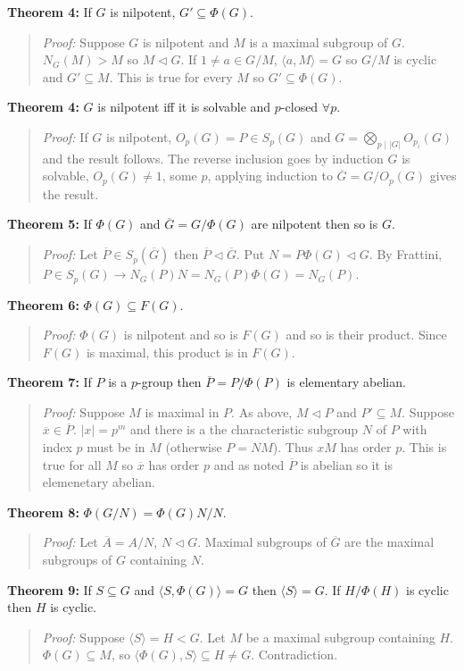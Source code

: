 {\bf Theorem 4:} If $G$ is nilpotent, $G' \subseteq \Phi(G)$.
\begin{quote}
\emph{Proof:}  Suppose $G$ is nilpotent and $M$ is a maximal subgroup of $G$.
$N_G(M)>M$ so $M \lhd G$.  If $1 \ne a \in G/M$, $ \langle a, M \rangle = G$ so $G/M$ is cyclic and
$G' \subseteq M$.  This is true for every $M$ so $G' \subseteq \Phi(G)$.
\end{quote}
{\bf Theorem 4:} $G$ is nilpotent iff it is solvable and $p$-closed $\forall p$.
\begin{quote}
\emph{Proof:} If $G$ is nilpotent, $O_p(G) = P \in S_p(G)$ and $G= \bigotimes_{p \mid |G|} O_{p_i}(G)$ and the result follows.
The reverse inclusion goes by induction $G$ is solvable, $O_p(G) \neq 1$, some $p$, applying induction to ${\overline G}=
G/O_p(G)$ gives the result.
\end{quote}
{\bf Theorem 5:} If $\Phi(G)$ and ${\overline G}= G/\Phi(G)$ are nilpotent then so is $G$.
\begin{quote}
\emph{Proof:} Let ${\overline P} \in S_p({\overline G})$ then ${\overline P} \lhd {\overline G}$.
Put $N= P \Phi(G) \lhd G$.  
By Frattini, $P \in S_p(G) \rightarrow N_G(P)N= N_G(P) \Phi(G)= N_G(P)$.
\end{quote}
{\bf Theorem 6:} $\Phi(G) \subseteq F(G)$.
\begin{quote}
\emph{Proof:} $\Phi(G)$ is nilpotent and so is $F(G)$ and so is their product.  Since
$F(G)$ is maximal, this product is in $F(G)$.
\end{quote}
{\bf Theorem 7:} If $P$ is a $p$-group then ${\overline P}= P/\Phi(P)$ is elementary abelian.
\begin{quote}
\emph{Proof:}  Suppose $M$ is maximal in $P$.  As above, $M \lhd P$ and $P' \subseteq M$.
Suppose ${\overline x} \in {\overline P}$.  $|x|= p^m$ and there is a the characteristic
subgroup $N$ of $P$ with index $p$ must be in $M$ (otherwise $P=NM$).  
Thus $xM$ has order $p$.  This is
true for all $M$ so ${\overline x}$ has order $p$ and as noted ${\overline P}$ is abelian so
it is elemenetary abelian.
\end{quote}
{\bf Theorem 8:} $\Phi(G/N)= \Phi(G)N/N$.
\begin{quote}
\emph{Proof:} Let ${\overline A}= A/N$, $N \lhd G$.  Maximal subgroups of ${\overline G}$ are
the maximal subgroups of $G$ containing $N$.
\end{quote}
{\bf Theorem 9:} If $S \subseteq G$ and $ \langle S, \Phi(G) \rangle =G$ then $ \langle S \rangle
=G$.  If $H/\Phi(H)$ is cyclic then $H$ is cyclic.
\begin{quote}
\emph{Proof:}  Suppose $ \langle S \rangle
=H < G$. Let  $M$ be a maximal subgroup containing $H$.  
$\Phi(G) \subseteq M$, so $ \langle \Phi(G), S \rangle \subseteq H \ne G$.  Contradiction.
\end{quote}
